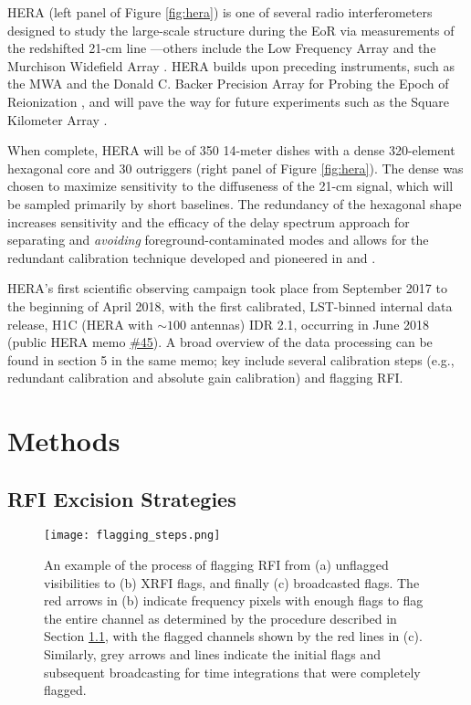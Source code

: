 \documentclass[12pt]{article}
\begin{document}
HERA (left panel of Figure \ref{fig:hera}) is one of several radio interferometers designed to study the large-scale structure during the EoR via measurements of the redshifted 21-cm line \citep{deboer2017}---others include the Low Frequency Array \citep[LOFAR;][]{vanHaarlem2013} and the Murchison Widefield Array \citep[MWA;][]{tingay2013}. HERA builds upon preceding instruments, such as the MWA and the Donald C. Backer Precision Array for Probing the Epoch of Reionization \citep[PAPER;][]{parsons2010}, and will pave the way for future experiments such as the Square Kilometer Array \cite[SKA; e.g.,][]{mellema2013}.

When complete, HERA will be  of 350 14-meter dishes with a dense 320-element hexagonal core and 30 outriggers (right panel of Figure \ref{fig:hera}). The dense  was chosen to maximize sensitivity to the diffuseness of the 21-cm signal, which will be sampled primarily by short baselines. The redundancy of the hexagonal shape increases sensitivity and the efficacy of the delay spectrum approach for separating and \textit{avoiding} foreground-contaminated modes  and allows for the redundant calibration technique developed and pioneered in \cite{liu2010} and \cite{zheng2014}. 

HERA's first scientific observing campaign took place from September 2017 to the beginning of April 2018, with the first calibrated, LST-binned internal data release, H1C (HERA with $\sim 100$ antennas) IDR 2.1, occurring in June 2018 (public HERA memo \href{http://reionization.org/wp-content/uploads/2018/07/IDR2.1_Memo_v2.html}{\#45}). A broad overview of the data processing can be found in section 5 in the same memo; key  include several calibration steps (e.g., redundant calibration and absolute gain calibration) and flagging RFI.

\section{Methods} \label{sec:methods}

\subsection{RFI Excision Strategies} \label{subsec:rfi_excision}

\begin{figure}[p]
	\centering
	\texttt{[image: flagging\_steps.png]}
	\caption[Steps for flagging RFI]{An example of the process of flagging RFI from (a) unflagged visibilities to (b) XRFI flags, and finally (c) broadcasted flags. The red arrows in (b) indicate frequency pixels with enough flags to flag the entire channel as determined by the procedure described in Section \ref{subsec:rfi_excision}, with the flagged channels shown by the red lines in (c). Similarly, grey arrows and lines indicate the initial flags and subsequent broadcasting for time integrations that were completely flagged.}
	\label{fig:rfi_flagging}
\end{figure}
\end{document}
